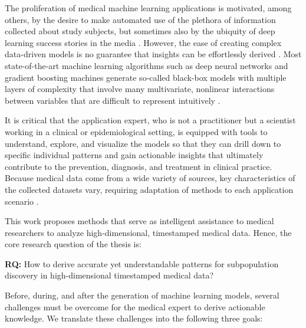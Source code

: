 \documentclass[
  oneside]{book}
\begin{document}
The proliferation of medical machine learning applications is motivated, among others, by the desire to make automated use of the plethora of information collected about study subjects, but sometimes also by the ubiquity of deep learning success stories in the media \autocite{car2019beyond}.
However, the ease of creating complex data-driven models is no guarantee that insights can be effortlessly derived \autocite{chen2017machine}.
Most state-of-the-art machine learning algorithms such as deep neural networks \autocite{Goodfellow:DL2016} and gradient boosting machines \autocite{Friedman:PDP2001} generate so-called black-box models with multiple layers of complexity that involve many multivariate, nonlinear interactions between variables that are difficult to represent intuitively \autocite{adadi2018peeking,carvalho2019machine}.

It is critical that the application expert, who is not a practitioner but a scientist working in a clinical or epidemiological setting, is equipped with tools to understand, explore, and visualize the models \autocite{preim2020survey,vellido2019importance} so that they can drill down to specific individual patterns and gain actionable insights that ultimately contribute to the prevention, diagnosis, and treatment in clinical practice.
Because medical data come from a wide variety of sources, key characteristics of the collected datasets vary, requiring adaptation of methods to each application scenario \autocite{Corvo2020}.

This work proposes methods that serve as intelligent assistance to medical researchers to analyze high-dimensional, timestamped medical data.
Hence, the core research question of the thesis is:

\begin{main-rq}

\textbf{RQ:} How to derive accurate yet understandable patterns for subpopulation discovery in high-dimensional timestamped medical data?

\end{main-rq}

Before, during, and after the generation of machine learning models, several challenges must be overcome for the medical expert to derive actionable knowledge.
We translate these challenges into the following three goals:
\end{document}
